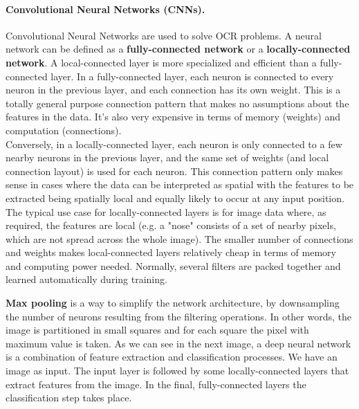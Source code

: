 \paragraph*{Convolutional Neural Networks (CNNs).} Convolutional Neural Networks are used to solve OCR problems. A neural network can be defined as a \textbf{fully-connected network} or a \textbf{locally-connected network}. A local-connected layer is more specialized and efficient than a fully-connected layer. In a fully-connected layer, each neuron is connected to every neuron in the previous layer, and each connection has its own weight. This is a totally general purpose connection pattern that makes no assumptions about the features in the data. It's also very expensive in terms of memory (weights) and computation (connections).\\
Conversely, in a locally-connected layer, each neuron is only connected to a few nearby neurons in the previous layer, and the same set of weights (and local connection layout) is used for each neuron. This connection pattern only makes sense in cases where the data can be interpreted as spatial with the features to be extracted being spatially local and equally likely to occur at any input position. The typical use case for locally-connected layers is for image data where, as required, the features are local (e.g. a "nose" consists of a set of nearby pixels, which are not spread across the whole image). The smaller number of connections and weights makes local-connected layers relatively cheap in terms of memory and computing power needed.
Normally, several filters are packed together and learned automatically during training.

\textbf{Max pooling} is a way to simplify the network architecture, by downsampling the number of neurons resulting from the filtering operations. In other words, the image is partitioned in small squares and for each square the pixel with maximum value is taken.
As we can see in the next image, a deep neural network is a combination of feature extraction and classification processes. We have an image as input. The input layer is followed by some locally-connected layers that extract features from the image. In the final, fully-connected layers the classification step takes place.

